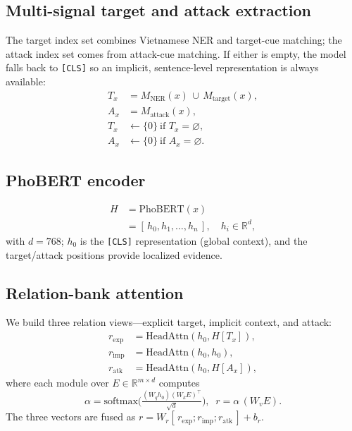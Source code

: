 \documentclass[11pt]{article}
\begin{document}
\subsection{Multi-signal target and attack extraction}
The target index set combines Vietnamese NER and target-cue matching; the attack index set comes from attack-cue matching. If either is empty, the model falls back to \texttt{[CLS]} so an implicit, sentence-level representation is always available:
\begin{equation}
\begin{aligned}
  T_x &= M_{\mathrm{NER}}(x)\,\cup\,M_{\mathrm{target}}(x), \\
  A_x &= M_{\mathrm{attack}}(x), \\
  T_x &\leftarrow \{0\}\ \text{if } T_x=\varnothing, \\
  A_x &\leftarrow \{0\}\ \text{if } A_x=\varnothing.
\end{aligned}
\end{equation}

\subsection{PhoBERT encoder}
\begin{equation}
\begin{aligned}
  H &= \mathrm{PhoBERT}(x) \\
    &= [\,h_0, h_1, \dots, h_n\,], \quad h_i \in \mathbb{R}^{d},
\end{aligned}
\end{equation}
with $d=768$; $h_0$ is the \texttt{[CLS]} representation (global context), and the target/attack positions provide localized evidence.

\subsection{Relation-bank attention}
We build three relation views---explicit target, implicit context, and attack:
\begin{align}
  r_{\mathrm{exp}} &= \mathrm{HeadAttn}(h_0, H[T_x]), \nonumber\\
  r_{\mathrm{imp}} &= \mathrm{HeadAttn}(h_0, h_0), \\
  r_{\mathrm{atk}} &= \mathrm{HeadAttn}(h_0, H[A_x]), \nonumber
\end{align}
where each module over $E \in \mathbb{R}^{m\times d}$ computes
\begin{equation}
  \alpha = \mathrm{softmax}\!\Big(\tfrac{(W_q h_0)(W_k E)^\top}{\sqrt d}\Big),\;\; r = \alpha\,(W_v E).
\end{equation}
The three vectors are fused as $r = W_r[\,r_{\mathrm{exp}};r_{\mathrm{imp}};r_{\mathrm{atk}}\,] + b_r$.
\end{document}
